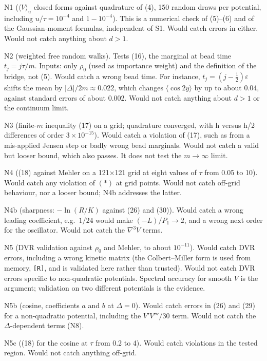 \documentclass[11pt,a4paper]{article}
\begin{document}
N1 (\(\langle V\rangle_u\) closed forms against quadrature of (4), 150 random draws per potential, including \(u/\tau=10^{-4}\) and \(1-10^{-4}\)). This is a numerical check of (5)--(6) and of the Gaussian-moment formulas, independent of S1. Would catch errors in either. Would not catch anything about \(d>1\).

N2 (weighted free random walks). Tests (16), the marginal at bead time \(t_j=j\tau/m\). Inputs: only \(\rho_0\) (used as importance weight) and the definition of the bridge, not (5). Would catch a wrong bead time. For instance, \(t_j=(j-\frac12)\varepsilon\) shifts the mean by \(|\Delta|/2m\approx0.022\), which changes \(\langle\cos2y\rangle\) by up to about 0.04, against standard errors of about 0.002. Would not catch anything about \(d>1\) or the continuum limit.

N3 (finite-\(m\) inequality (17) on a grid; quadrature converged, with h versus h/2 differences of order \(3\times10^{-15}\)). Would catch a violation of (17), such as from a mis-applied Jensen step or badly wrong bead marginals. Would not catch a valid but looser bound, which also passes. It does not test the \(m\to\infty\) limit.

N4 ((18) against Mehler on a 121×121 grid at eight values of \(\tau\) from 0.05 to 10). Would catch any violation of \((\ast)\) at grid points. Would not catch off-grid behaviour, nor a looser bound; N4b addresses the latter.

N4b (sharpness: \(-\ln(R/K)\) against (26) and (30)). Would catch a wrong leading coefficient, e.g.~\(1/24\) would make \((-L)/P_1\to2\), and a wrong next order for the oscillator. Would not catch the \(\nabla^3V\) terms.

N5 (DVR validation against \(\rho_0\) and Mehler, to about \(10^{-11}\)). Would catch DVR errors, including a wrong kinetic matrix (the Colbert--Miller form is used from memory, \texttt{[R]}, and is validated here rather than trusted). Would not catch DVR errors specific to non-quadratic potentials. Spectral accuracy for smooth \(V\) is the argument; validation on two different potentials is the evidence.

N5b (cosine, coefficients \(a\) and \(b\) at \(\Delta=0\)). Would catch errors in (26) and (29) for a non-quadratic potential, including the \(V'V'''/30\) term. Would not catch the \(\Delta\)-dependent terms (N8).

N5c ((18) for the cosine at \(\tau\) from 0.2 to 4). Would catch violations in the tested region. Would not catch anything off-grid.
\end{document}
